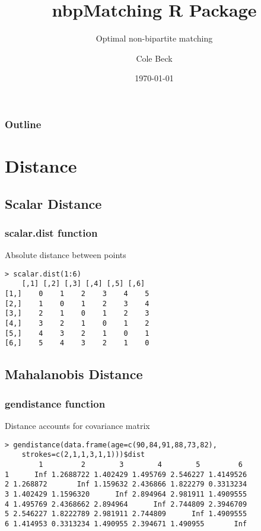 \documentclass{beamer}
\title{nbpMatching R Package}
\subtitle{Optimal non-bipartite matching}
\author{Cole Beck}
\institute{Vanderbilt University}
\date{\today}
\begin{document}
\begin{frame}
\titlepage
\end{frame}

\begin{frame}
\frametitle{Outline}
\tableofcontents
\end{frame}

\section{Distance}
\subsection{Scalar Distance}

\begin{frame}[fragile=singleslide]
\frametitle{scalar.dist function}
Absolute distance between points

\begin{verbatim}
> scalar.dist(1:6)
    [,1] [,2] [,3] [,4] [,5] [,6]
[1,]    0    1    2    3    4    5
[2,]    1    0    1    2    3    4
[3,]    2    1    0    1    2    3
[4,]    3    2    1    0    1    2
[5,]    4    3    2    1    0    1
[6,]    5    4    3    2    1    0
\end{verbatim}
\end{frame}

\subsection{Mahalanobis Distance}

\begin{frame}[fragile=singleslide]
\frametitle{gendistance function}
Distance accounts for covariance matrix

\begin{verbatim}
> gendistance(data.frame(age=c(90,84,91,88,73,82),
    strokes=c(2,1,1,3,1,1)))$dist
        1         2        3        4        5         6
1      Inf 1.2688722 1.402429 1.495769 2.546227 1.4149526
2 1.268872       Inf 1.159632 2.436866 1.822279 0.3313234
3 1.402429 1.1596320      Inf 2.894964 2.981911 1.4909555
4 1.495769 2.4368662 2.894964      Inf 2.744809 2.3946709
5 2.546227 1.8222789 2.981911 2.744809      Inf 1.4909555
6 1.414953 0.3313234 1.490955 2.394671 1.490955       Inf

\end{verbatim}
\end{frame}
\end{document}
